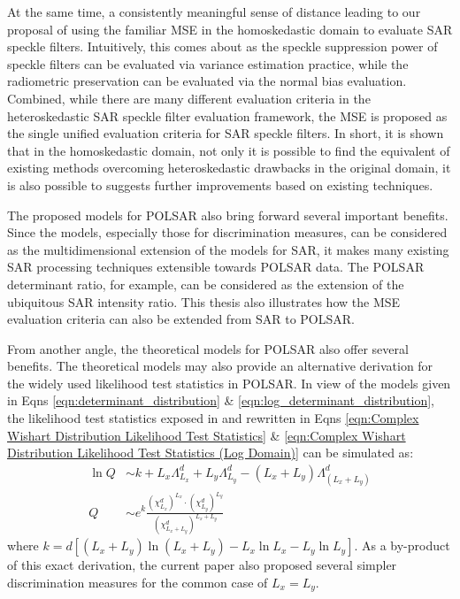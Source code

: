 At
                the same time, a consistently meaningful sense of
                distance leading to our proposal of using the familiar
                MSE in the homoskedastic domain to evaluate SAR speckle
                filters.
Intuitively,
                this comes about as the speckle suppression power of
                speckle filters can be evaluated via variance estimation
                practice, while the radiometric preservation can be
                evaluated via the normal bias evaluation.
Combined,
                while there are many different evaluation criteria in
                the heteroskedastic SAR speckle filter evaluation
                framework, the MSE is proposed as the single unified
                evaluation criteria for SAR speckle filters.
In
                short, it is shown that in the homoskedastic domain, not
                only it is possible to find the equivalent of existing
                methods overcoming heteroskedastic drawbacks in the
                original domain, it is also possible to suggests further
                improvements based on existing techniques.

The
                proposed models for POLSAR also bring forward several
                important benefits.
Since
                the models, especially those for discrimination
                measures, can be considered as the multidimensional
                extension of the models for SAR, it makes many existing
                SAR processing techniques extensible towards POLSAR
                data.
The POLSAR determinant ratio, for example, can be considered as
                the extension of the ubiquitous SAR intensity ratio.
This
                thesis also illustrates how the MSE evaluation
                criteria can also be extended from SAR to POLSAR.

From another angle, the theoretical models for POLSAR also offer several benefits.
The theoretical models may also provide an alternative derivation for the widely used likelihood test statistics in POLSAR.
In view of the models given in Eqns \ref{eqn:determinant_distribution} \& \ref{eqn:log_determinant_distribution},
  the likelihood test statistics exposed in \cite{Conradsen_2003_TGRS_4} and rewritten in Eqns \ref{eqn:Complex Wishart Distribution Likelihood Test Statistics} \& \ref{eqn:Complex Wishart Distribution Likelihood Test Statistics (Log Domain)}
can be simulated as:
\begin{align}
  \ln{Q} &\sim  k + L_x \Lambda^d_{L_x} + L_y \Lambda^d_{L_y} - (L_x + L_y) \Lambda^d_{(L_x + L_y)} \\
  Q &\sim e^k \frac{(\chi^d_{L_x})^{L_x} \cdot (\chi^d_{L_y})^{L_y}}{(\chi^d_{L_x + L_y})^{L_x + L_y}}   
\end{align}
where $k = d \left[ (L_x + L_y) \ln(L_x + L_y) - L_x \ln{L_x} - L_y \ln{L_y} \right]$.
As a by-product of this exact derivation, the current paper also proposed several simpler discrimination measures for the common case of $L_x=L_y$.

